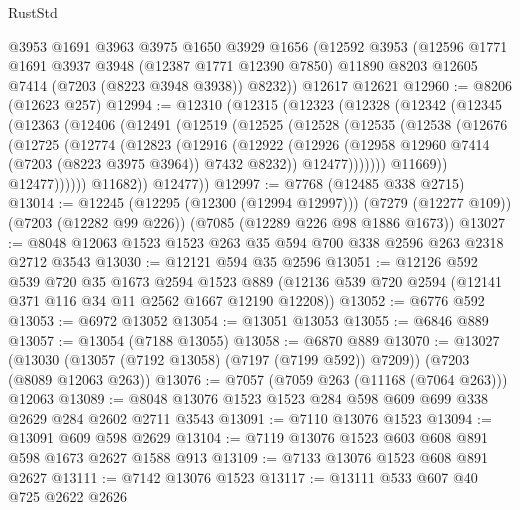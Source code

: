 \begin{lexlean}{RustStd}
\begin{coremodule}
    @3953
    @1691
    @3963
    @3975
    @1650
    @3929
    @1656
    (@12592
      @3953
      (@12596
        @1771
        @1691
        @3937
        @3948
        (@12387 @1771 @12390 @7850)
        @11890
        @8203
        @12605
        @7414
        (@7203 (@8223 @3948 @3938))
        @8232))
    @12617
    @12621
@12960 := @8206 (@12623 @257)
@12994 := @12310
    (@12315
      (@12323
        (@12328
          (@12342
            (@12345
              (@12363
                (@12406
                  (@12491
                    (@12519
                      (@12525
                        (@12528
                          (@12535
                            (@12538
                              (@12676
                                (@12725
                                  (@12774
                                    (@12823
                                      (@12916
                                        (@12922
                                          (@12926
                                            (@12958
                                              @12960
                                              @7414
                                              (@7203 (@8223 @3975 @3964))
                                              @7432
                                              @8232))
                                          @12477)))))))
                            @11669))
                        @12477))))))
            @11682))
        @12477))
@12997 := @7768 (@12485 @338 @2715)
@13014 := @12245
    (@12295 (@12300 (@12994 @12997)))
    (@7279 (@12277 @109))
    (@7203 (@12282 @99 @226))
    (@7085 (@12289 @226 @98 @1886 @1673))
@13027 := @8048 @12063 @1523 @1523 @263 @35 @594 @700 @338 @2596 @263 @2318 @2712 @3543
@13030 := @12121 @594 @35 @2596
@13051 := @12126
    @592
    @539
    @720
    @35
    @1673
    @2594
    @1523
    @889
    (@12136 @539 @720 @2594 (@12141 @371 @116 @34 @11 @2562 @1667 @12190 @12208))
@13052 := @6776 @592
@13053 := @6972 @13052
@13054 := @13051 @13053
@13055 := @6846 @889
@13057 := @13054 (@7188 @13055)
@13058 := @6870 @889
@13070 := @13027
    (@13030 (@13057 (@7192 @13058) (@7197 (@7199 @592)) @7209))
    (@7203 (@8089 @12063 @263))
@13076 := @7057 (@7059 @263 (@11168 (@7064 @263))) @12063
@13089 := @8048 @13076 @1523 @1523 @284 @598 @609 @699 @338 @2629 @284 @2602 @2711 @3543
@13091 := @7110 @13076 @1523
@13094 := @13091 @609 @598 @2629
@13104 := @7119 @13076 @1523 @603 @608 @891 @598 @1673 @2627 @1588 @913
@13109 := @7133 @13076 @1523 @608 @891 @2627
@13111 := @7142 @13076 @1523
@13117 := @13111 @533 @607 @40 @725 @2622 @2626

\end{coremodule}
\end{lexlean}

